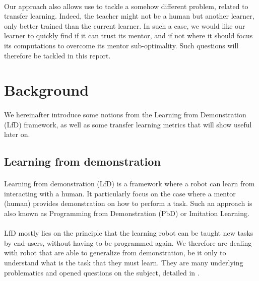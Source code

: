 \documentclass[a4paper]{report}
\begin{document}
{{			\paragraph{} Our approach also allows use to tackle a somehow different problem, related to transfer learning. Indeed, the teacher might not be a human but another learner, only better trained than the current learner. In such a case, we would like our learner to quickly find if it can trust its mentor, and if not where it should focus its computations to overcome its mentor sub-optimality. Such questions will therefore be tackled in this report. 
		}
		\section{Background}
		{
			\paragraph{} We hereinafter introduce some notions from the Learning from Demonstration (LfD) framework, as well as some transfer learning metrics that will show useful later on. 
			\subsection{Learning from demonstration}
			{
				\label{subsection::lfd}
				\paragraph{} Learning from demonstration (LfD) is a framework where a robot can learn from interacting with a human. It particularly focus on the case where a mentor (human) provides demonstration on how to perform a task. Such an approach is also known as Programming from Demonstration (PbD) or Imitation Learning. 
				
				\paragraph{} LfD mostly lies on the principle that the learning robot can be taught new tasks by end-users, without having to be programmed again. We therefore are dealing with robot that are able to generalize from demonstration, be it only to understand what is the task that they must learn. They are many underlying problematics and opened questions on the subject, detailed in \cite{Billard2016}.
				
}}}
\end{document}
